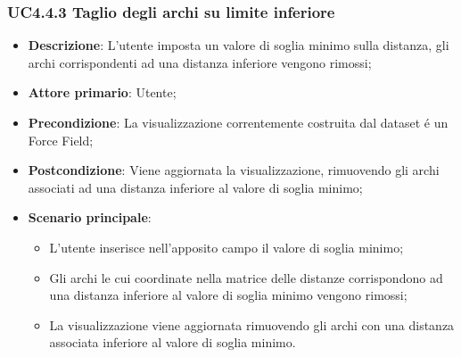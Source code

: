 \subsubsection{UC4.4.3 Taglio degli archi su limite inferiore}
\label{ssub:uc4.4.3}
\begin{itemize}
    \item \textbf{Descrizione}:     L'utente imposta un valore di soglia minimo sulla distanza, gli archi corrispondenti ad una distanza inferiore vengono rimossi;
    \item \textbf{Attore primario}: Utente;
    \item \textbf{Precondizione}:   La visualizzazione correntemente costruita dal dataset é un Force Field;
    \item \textbf{Postcondizione}:  Viene aggiornata la visualizzazione, rimuovendo gli archi associati ad una distanza inferiore al valore di soglia minimo;
    \item \textbf{Scenario principale}:
    \begin{itemize}
        \item L'utente inserisce nell'apposito campo il valore di soglia minimo;
        \item Gli archi le cui coordinate nella matrice delle distanze corrispondono ad una distanza inferiore al valore di soglia minimo vengono rimossi;
        \item La visualizzazione viene aggiornata rimuovendo gli archi con una distanza associata inferiore al valore di soglia minimo.
    \end{itemize}
\end{itemize}

